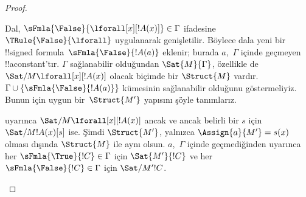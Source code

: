 \documentclass[../../../include/open-logic-section]{subfiles}
\begin{document}
\begin{proof}
\begin{enumerate}
{\item Dal, $\sFmla{\False}{\lforall[x][!A(x)]} \in \Gamma$ ifadesine
  $\TRule{\False}{\lforall}$ uygulanarak genişletilir. Böylece dala yeni bir
  !!{signed formula}~$\sFmla{\False}{!A(a)}$ eklenir; burada $a$,~$\Gamma$
  içinde geçmeyen !!a{constant}'tır. $\Gamma$ sağlanabilir olduğundan
  $\Sat{M}{\Gamma}$, özellikle de
  $\Sat/{M}{\lforall[x][!A(x)]}$ olacak biçimde bir $\Struct{M}$ vardır.
  $\Gamma \cup \{\sFmla{\False}{!A(a)}\}$ kümesinin sağlanabilir olduğunu
  göstermeliyiz. Bunun için uygun bir~$\Struct{M'}$ yapısını şöyle tanımlarız.

   uyarınca
  $\Sat/{M}{\lforall[x][!A(x)]}$ ancak ve ancak belirli bir $s$ için
  $\Sat/{M}{!A(x)}[s]$ ise. Şimdi $\Struct{M'}$, yalnızca
  $\Assign{a}{M'} = s(x)$ olması dışında $\Struct{M}$ ile aynı olsun.
  $a$,~$\Gamma$ içinde geçmediğinden
   uyarınca her
  $\sFmla{\True}{!C} \in \Gamma$ için $\Sat{M'}{!C}$ ve her
  $\sFmla{\False}{!C} \in \Gamma$ için $\Sat/{M'}{!C}$.

}
\end{enumerate}
\end{proof}
\end{document}
